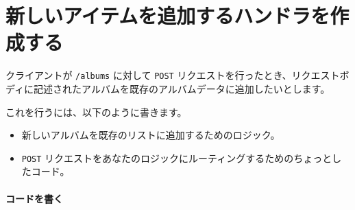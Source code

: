 


\section{新しいアイテムを追加するハンドラを作成する}

クライアントが \texttt{/albums} に対して \texttt{POST}
リクエストを行ったとき、リクエストボディに記述されたアルバムを既存のアルバムデータに追加したいとします。

これを行うには、以下のように書きます。

\begin{itemize}
\item
  新しいアルバムを既存のリストに追加するためのロジック。
\item
  \texttt{POST}
  リクエストをあなたのロジックにルーティングするためのちょっとしたコード。
\end{itemize}


\paragraph{コードを書く}

